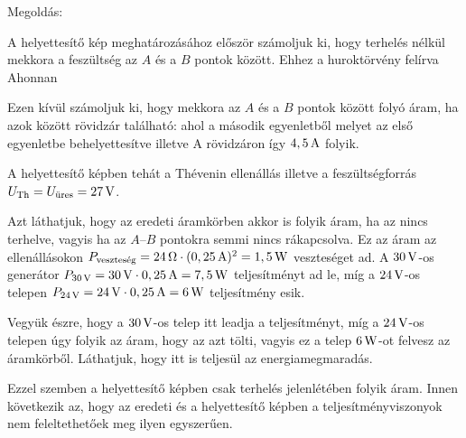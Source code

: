 
\ifdefined\megoldas

 Megoldás: 

 A helyettesítő kép meghatározásához először számoljuk ki, hogy terhelés nélkül mekkora a feszültség az $A$ és a $B$ pontok között. Ehhez a huroktörvény felírva
 Ahonnan

 Ezen kívül számoljuk ki, hogy mekkora az $A$ és a $B$ pontok között folyó áram, ha azok között rövidzár található:
 ahol a második egyenletből
 melyet az első egyenletbe behelyettesítve
 illetve
 A rövidzáron így $4,5\mathrm{\, A}$ folyik. 

 A helyettesítő képben tehát a Th\'evenin ellenállás
 illetve a feszültségforrás $U_\text{Th}=U_\text{üres}=27\mathrm{\, V}$.

 Azt láthatjuk, hogy az eredeti áramkörben akkor is folyik áram, ha az nincs terhelve, vagyis ha az $A$--$B$ pontokra semmi nincs rákapcsolva. Ez az áram az ellenállásokon $P_\text{veszteség}=24\mathrm{\, \Omega}\cdot (0,25\mathrm{\, A})^2=1,5\mathrm{\, W}$ veszteséget ad. A $30\mathrm{\, V}$-os generátor $P_{30\mathrm{\, V}}=30\mathrm{\, V}\cdot 0,25\mathrm{\, A}=7,5\mathrm{\, W}$ teljesítményt ad le, míg a $24\mathrm{\, V}$-os telepen $P_{24\mathrm{\, V}}=24\mathrm{\, V}\cdot 0,25\mathrm{\, A}=6\mathrm{\, W}$ teljesítmény esik. 

 Vegyük észre, hogy a $30\mathrm{\, V}$-os telep itt leadja a teljesítményt, míg a $24\mathrm{\, V}$-os telepen úgy folyik az áram, hogy az azt tölti, vagyis ez a telep $6\mathrm{\, W}$-ot felvesz az áramkörből. Láthatjuk, hogy itt is teljesül az energiamegmaradás. 

 Ezzel szemben a helyettesítő képben csak terhelés jelenlétében folyik áram. Innen következik az, hogy az eredeti és a helyettesítő képben a teljesítményviszonyok nem feleltethetőek meg ilyen egyszerűen.
 
\fi